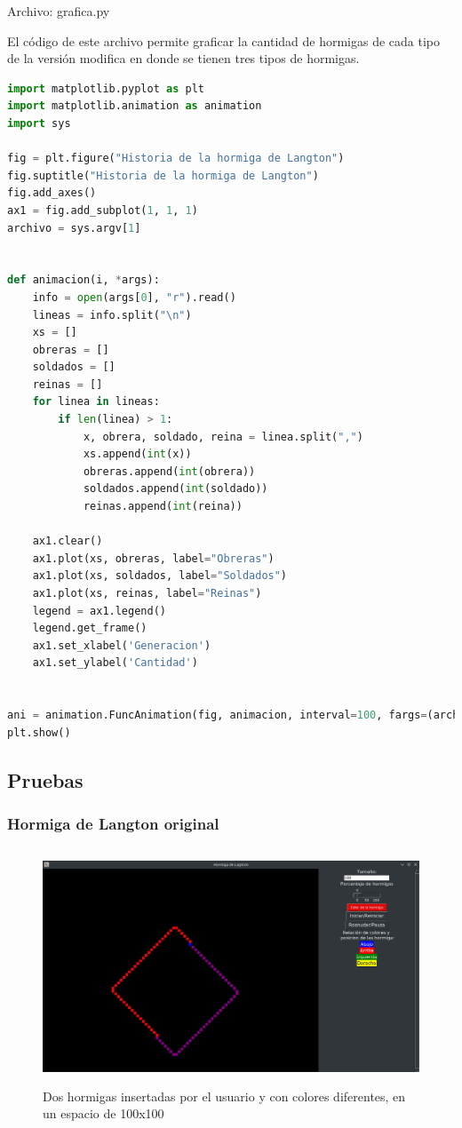 Archivo: grafica.py

El código de este archivo permite graficar la cantidad de hormigas de cada tipo de la versión modifica en donde se tienen tres tipos de hormigas.
\begin{lstlisting}[language=Python]
import matplotlib.pyplot as plt
import matplotlib.animation as animation
import sys

fig = plt.figure("Historia de la hormiga de Langton")
fig.suptitle("Historia de la hormiga de Langton")
fig.add_axes()
ax1 = fig.add_subplot(1, 1, 1)
archivo = sys.argv[1]


def animacion(i, *args):
    info = open(args[0], "r").read()
    lineas = info.split("\n")
    xs = []
    obreras = []
    soldados = []
    reinas = []
    for linea in lineas:
        if len(linea) > 1:
            x, obrera, soldado, reina = linea.split(",")
            xs.append(int(x))
            obreras.append(int(obrera))
            soldados.append(int(soldado))
            reinas.append(int(reina))

    ax1.clear()
    ax1.plot(xs, obreras, label="Obreras")
    ax1.plot(xs, soldados, label="Soldados")
    ax1.plot(xs, reinas, label="Reinas")
    legend = ax1.legend()
    legend.get_frame()
    ax1.set_xlabel('Generacion')
    ax1.set_ylabel('Cantidad')


ani = animation.FuncAnimation(fig, animacion, interval=100, fargs=(archivo,))
plt.show()
\end{lstlisting}

\subsection{Pruebas}
\subsubsection{Hormiga de Langton original}

\begin{figure}[H]
\begin{center}
 \includegraphics[width=12cm, height=7cm]{img/original1.png}
 \caption{Dos hormigas insertadas por el usuario y con colores diferentes, en un espacio de 100x100}
 \label{fig:original1}
\end{center}
\end{figure}

